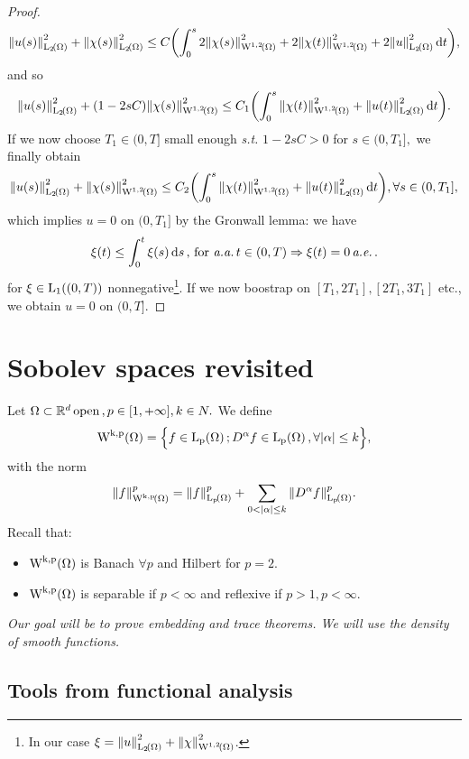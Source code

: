 \documentclass{article}
\begin{document}
\begin{proof}
	\[
		\norm{u(s)}_{\LpSet[2]{\Omega}}^{2} + \norm{\chi(s)}_{\LpSet[2]{\Omega}}^{2} \leq C\qty(\int_0^s 2 \norm{\chi(s)}_{\WkpSet[1][2]{\Omega}}^{2}+ 2\norm{\chi(t)}_{\WkpSet[1][2]{\Omega}}^{2} + 2 \norm{u}_{\LpSet[2]{\Omega}}^{2}\dd{t}),
	\]
	and so
	\[
		\norm{u(s)}_{\LpSet[2]{\Omega}}^{2} + (1-2sC) \norm{\chi(s)}_{\WkpSet[1][2]{\Omega}}^{2} \leq C_1 \qty(\int_0^s \norm{\chi(t)}_{\WkpSet[1][2]{\Omega}}^{2} + \norm{u(t)}_{\LpSet[2]{\Omega}}^{2} \dd{t}).
	\]
	If we now choose $T_1 \in (0,T]$ small enough \textit{s.t.} $1-2sC > 0$ for $s \in (0,T_1],$ we finally obtain
	\[
		\norm{u(s)}_{\LpSet[2]{\Omega}}^{2} + \norm{\chi(s)}_{\WkpSet[1][2]{\Omega}}^{2} \leq C_2 \qty(\int_0^s \norm{\chi(t)}_{\WkpSet[1][2]{\Omega}}^{2} + \norm{u(t)}_{\LpSet[2]{\Omega}}^{2}\dd{t}), \forall s \in (0,T_1],
	\]
which implies $u = 0$ on $(0,T_1]$ by the Gronwall lemma: we have
\[
	\xi(t) \leq \int_0^t \xi(s) \dd{s}, \, \text{for} \, \, \text{\textit{a.a.}} \, t \in (0,T) \Rightarrow \xi(t) = 0 \, \text{\textit{a.e.}} \,.
\]
for $\xi \in \LpSet[1]{(0,T)}$ nonnegative\footnote{In our case $\xi = \norm{u}_{\LpSet[2]{\Omega}}^{2} + \norm{\chi}_{\WkpSet[1][2]{\Omega}}^{2}$.}.
If we now boostrap on $[T_1, 2T_1], [2T_1, 3T_1]$ etc., we obtain $u = 0$ on $(0,T]$.


\end{proof}


\section{Sobolev spaces revisited}
\label{sec:sobolev_revisited}
Let $\Omega \subset {\mathbb R}^d \, \text{open} \,, p \in [1,+\infty], k \in N.$ We define
\[
	\WkpSet{\Omega} = \Big\{f \in \LpSet{\Omega}; D^\alpha f \in \LpSet{\Omega}, \forall |\alpha| \leq k \Big\},
\]
with the norm
\[
	\norm{f}_{\WkpSet{\Omega}}^p = \norm{f}_{\LpSet{\Omega}}^p + \sum_{0< |\alpha| \leq k} \norm{D^\alpha f}_{\LpSet{\Omega}}^p.
\]
Recall that:
\begin{itemize}
	\item	$\WkpSet{\Omega}$ is Banach $\forall p$ and Hilbert for $p=2$. 
	\item $\WkpSet{\Omega}$ is separable if $p < \infty$ and reflexive if $p>1, p<\infty$.
\end{itemize}


\textit{Our goal will be to prove embedding and trace theorems. We will use the density of smooth functions.}

\subsection{Tools from functional analysis}
\label{sec:fa_tools}
\end{document}
